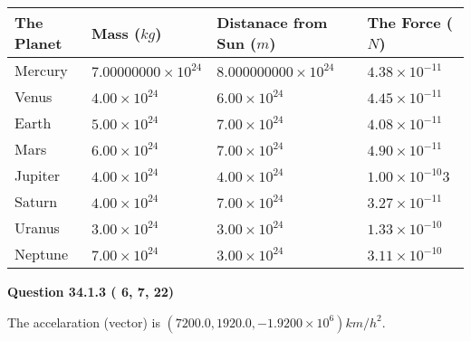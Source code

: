 \documentclass[12pt]{article}
\begin{document}
\vspace{0.2in}
 
 
\begin{tabular}{|l|l|l|l|}
\hline
The Planet & Mass ($kg$) & Distanace from Sun ($m$) & The Force ($N$)\\
\hline
Mercury  &
           $ %
7.00000000 \times 10^{24}  $   &
             $ %
8.000000000 \times 10^{24}$    & $ %
4.38 \times 10^{-11} $
\\  \hline
Venus    &
           $  %
4.00 \times 10^{24}  $     &
             $ %
6.00 \times 10^{24} $    & $ %
4.45 \times 10^{-11} $
\\  \hline
Earth    &
           $  %
5.00 \times 10^{24}$     &
             $ %
7.00 \times 10^{24} $    & $ %
4.08 \times 10^{-11} $
\\   \hline
Mars     &
           $  %
6.00 \times 10^{24} $     &
             $ %
7.00 \times 10^{24}$    & $ %
4.90 \times 10^{-11} $
\\   \hline
Jupiter  &
           $  %
4.00 \times 10^{24}  $    &
             $ %
4.00 \times 10^{24} $    & $ %
1.00 \times 10^{-10}3 $
\\  \hline
Saturn   &
           $  %
4.00 \times 10^{24}   $    &
             $ %
7.00 \times 10^{24}  $    & $ %
3.27 \times 10^{-11} $
\\  \hline
Uranus   &
           $  %
3.00 \times 10^{24} $    &
             $ %
3.00 \times 10^{24}$    & $ %
1.33 \times 10^{-10} $
\\  \hline
Neptune  &
           $  %
7.00 \times 10^{24}  $    &
             $ %
3.00 \times 10^{24} $    & $ %
3.11 \times 10^{-10} $
\\  \hline
 
\end{tabular}
 
 
 
 
  
\vspace{0.2in}
  
{\textbf{\Large{Question
34.1.3 
 (          6,          7,         22)
}}}
  
  
 
 
\noindent{}
 
 
The accelaration (vector) is
$(
7200.0,
1920.0 ,
-1.9200 \times 10^{6}
)km/h^2.
$
 
 
 
 
  
\end{document}
